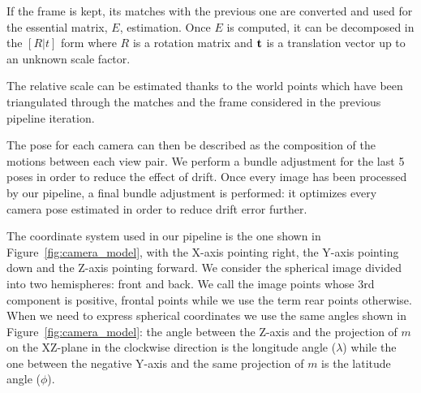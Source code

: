 If the frame is kept, its matches with the previous one are converted
and used for the essential matrix, $E$, estimation. Once $E$ is computed, 
it can be decomposed in the \([R|t]\) form where $R$ is a rotation matrix 
and $\mathbf{t}$ is a translation vector up to an unknown scale factor.

The relative scale can be estimated thanks to the world points which have been 
triangulated through the matches and the frame considered in the previous pipeline 
iteration.

The pose for each camera can then be described as the composition of the 
motions between each view pair. We perform a bundle adjustment for the last 5 
poses in order to reduce the effect of drift.
Once every image has been processed by our pipeline, a final 
bundle adjustment is performed: it optimizes every camera pose estimated in order to 
reduce drift error further.

The coordinate system used in our pipeline is the one shown in 
Figure~\ref{fig:camera_model}, with the X-axis pointing right, the Y-axis 
pointing down and the Z-axis pointing forward.
We consider the spherical image divided into two hemispheres: front and back.
We call the image points 
whose 3rd component is positive, frontal points while we use the term rear 
points otherwise.
When we need to express spherical coordinates we use the same angles shown in 
Figure~\ref{fig:camera_model}:
the angle between the Z-axis and the projection of $m$ on the XZ-plane in 
the clockwise direction is the longitude angle ($\lambda$) while the one 
between the negative Y-axis and the same projection of $m$ is the latitude 
angle ($\phi$).

